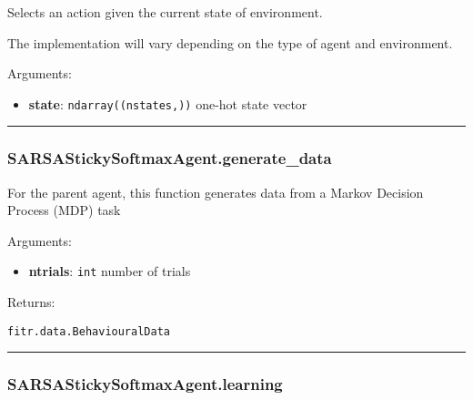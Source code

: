 Selects an action given the current state of environment.

The implementation will vary depending on the type of agent and
environment.

Arguments:

\begin{itemize}
\tightlist
\item
  \textbf{state}: \texttt{ndarray((nstates,))} one-hot state vector
\end{itemize}

\begin{center}\rule{0.5\linewidth}{\linethickness}\end{center}

\subsubsection{SARSAStickySoftmaxAgent.generate\_data}\label{sarsastickysoftmaxagent.generate_data}

\begin{Shaded}
\begin{Highlighting}[]
\end{Highlighting}
\end{Shaded}

For the parent agent, this function generates data from a Markov
Decision Process (MDP) task

Arguments:

\begin{itemize}
\tightlist
\item
  \textbf{ntrials}: \texttt{int} number of trials
\end{itemize}

Returns:

\texttt{fitr.data.BehaviouralData}

\begin{center}\rule{0.5\linewidth}{\linethickness}\end{center}

\subsubsection{SARSAStickySoftmaxAgent.learning}\label{sarsastickysoftmaxagent.learning}

\begin{Shaded}
\begin{Highlighting}[]
\end{Highlighting}
\end{Shaded}

